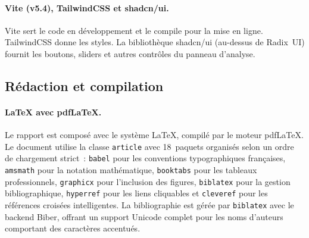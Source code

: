 \paragraph{Vite (v5.4), TailwindCSS et shadcn/ui.}
Vite sert le code en d\'eveloppement et le compile pour la mise en ligne.
TailwindCSS donne les styles. La biblioth\`eque shadcn/ui (au-dessus de
Radix~UI) fournit les boutons, sliders et autres contr\^oles du panneau
d'analyse.

\subsection{R\'edaction et compilation}

\paragraph{\LaTeX{} avec pdf\LaTeX{}.}
Le rapport est compos\'e avec le syst\`eme \LaTeX{}, compil\'e par le moteur
pdf\LaTeX{}. Le document utilise la classe \texttt{article} avec 18~paquets
organis\'es selon un ordre de chargement strict~: \texttt{babel} pour les
conventions typographiques fran\c{c}aises, \texttt{amsmath} pour la notation
math\'ematique, \texttt{booktabs} pour les tableaux professionnels,
\texttt{graphicx} pour l'inclusion des figures, \texttt{biblatex} pour la
gestion bibliographique, \texttt{hyperref} pour les liens cliquables et
\texttt{cleveref} pour les r\'ef\'erences crois\'ees intelligentes. La
bibliographie est g\'er\'ee par \texttt{biblatex} avec le backend Biber,
offrant un support Unicode complet pour les noms d'auteurs comportant des
caract\`eres accentu\'es.
